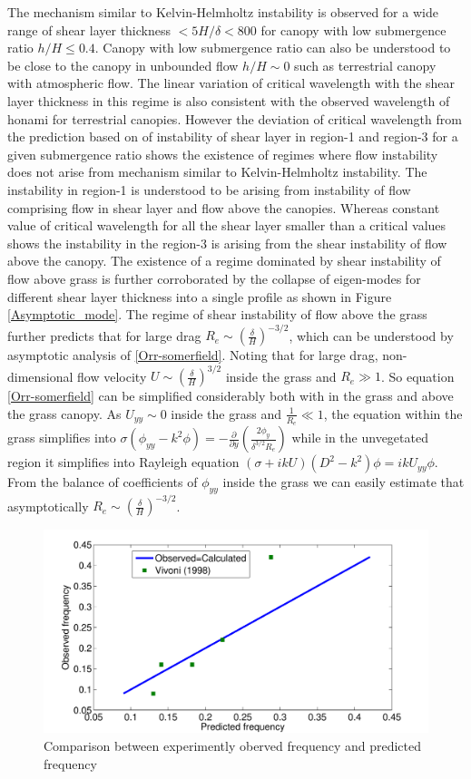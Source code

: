 \documentclass[aps,prl,twocolumn,showpacs,superscriptaddress,groupedaddress,10pt]{revtex4-1}  %
\newcommand{\del}{\partial}
\begin{document}
\newline
The mechanism similar to Kelvin-Helmholtz instability is observed for a wide range of shear layer thickness $ <5H/\delta <800$ for canopy with low submergence ratio $h/H\leq 0.4$.
Canopy with low submergence ratio can also be understood to be close to the canopy in unbounded flow $h/H\sim0$ such as terrestrial canopy with atmospheric flow. 
The linear variation of critical wavelength with the shear layer thickness in this regime is also consistent with the observed wavelength of honami for terrestrial canopies.
However the deviation of critical wavelength from the prediction based on of instability of shear layer in region-1 and region-3 for a given submergence ratio shows the existence of 
regimes where flow instability does not arise from mechanism similar to Kelvin-Helmholtz instability. The instability in region-1 is understood to be arising from instability of flow
comprising flow in shear layer and flow above the canopies. Whereas constant value of critical wavelength for all the shear layer smaller than a critical values shows the instability 
in the region-3 is arising from the shear instability of flow above the canopy. The existence of a regime dominated by shear instability of flow above grass is further corroborated 
by the collapse of eigen-modes for different shear layer thickness into a single profile as shown in Figure \ref{Asymptotic_mode}. The regime of shear instability of flow above the 
grass further predicts that for large drag $R_e \sim (\frac{\delta}{H})^{-3/2}$, which can be understood by asymptotic analysis of \eqref{Orr-somerfield}.
Noting that for large drag, non-dimensional flow velocity $U \sim (\frac{\delta}{H})^{3/2}$ inside the grass and $R_{e} \gg 1$. So equation \eqref{Orr-somerfield}
can be simplified considerably both with in the grass and above the grass canopy. As $U_{yy}\sim 0$ inside the grass and $\frac{1}{R_e} \ll 1$,
the equation within the grass simplifies into
$\sigma\left(\phi_{yy}-k^2\phi\right) = -\frac{\del}{\del y}\left(\frac{2\phi_y}{\delta^{3/2}R_e}\right)$ while in the unvegetated region it simplifies into Rayleigh equation 
$ \left(\sigma+ikU\right) \left(D^2-k^2\right)\phi =  ikU_{yy}\phi$. From the balance of coefficients of $\phi_{yy}$ inside the grass we can easily estimate that asymptotically 
$R_e \sim (\frac{\delta}{H})^{-3/2}$.
\begin{figure}[htb]
\includegraphics[scale=0.34]{Observed_vs_calculated}
\caption{Comparison between experimently oberved frequency and predicted frequency}
\label{Observed_calculated}
\end{figure}
\end{document}
